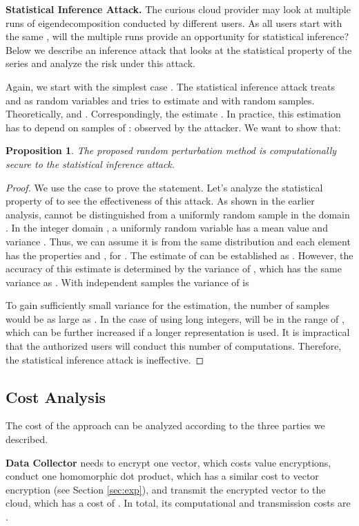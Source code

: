 \documentclass[10pt, conference, compsocconf]{IEEEtran}
\newtheorem{prop}[thm]{Proposition}
\begin{document}
\textbf{Statistical Inference Attack.} The curious cloud provider may look at multiple runs of eigendecomposition conducted by different users. As all users start with the same , will the multiple runs provide an opportunity for statistical inference? Below we describe an inference attack that looks at the statistical property of the series and analyze the risk under this attack. 


Again, we start with the simplest case . The statistical inference attack treats  and  as random variables and tries to estimate  and  with random samples. Theoretically,  and . Correspondingly, the estimate . In practice, this estimation has to depend on   samples of :  observed by the attacker. We want to show that:
\begin{prop}
The proposed random perturbation method is computationally secure to the statistical inference attack.
\end{prop}
\begin{proof}
We use the  case to prove the statement. Let's analyze the statistical property of  to see the effectiveness of this attack. 
As shown in the earlier analysis,  cannot be distinguished from a uniformly random sample in the domain . In the integer domain , a uniformly random variable  has a mean value  and variance .
Thus, we can assume it is from the same distribution and each element has the properties  and , for . The estimate  of  can be established as . However, the accuracy of this estimate is determined by the variance of , which has the same variance as . With   independent samples the variance of  is

To gain sufficiently small variance for the estimation, the number of samples  would be as large as . In the case of using long integers,  will be in the range of , which can be further increased if a longer representation is used. It is impractical that the authorized users will conduct this number of computations. Therefore, the statistical inference attack is ineffective. 
\end{proof}

\subsection{Cost Analysis}
The cost of the approach can be analyzed according to the three parties we described. 

\textbf{Data Collector} needs to encrypt one vector, which costs  value encryptions, conduct one homomorphic dot product, which has a similar cost to vector encryption (see Section \ref{sec:exp}), and transmit the encrypted vector to the cloud, which has a cost of . In total, its computational and transmission costs are .
\end{document}
